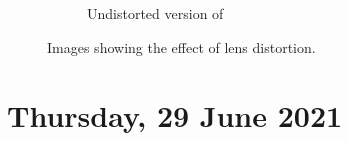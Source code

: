 \begin{figure}[H]
\begin{subfigure}[b]{0.45\textwidth}
        \caption{Undistorted version of }
        \label{fig:undistorted-checkerboard}
    \end{subfigure}
    \captionsetup{singlelinecheck = false, justification=justified}
    \caption{Images showing the effect of lens distortion.}
    \label{fig:checkerboard-distortion}
\end{figure}


\pendsign

\section[2021/06/29]{Thursday, 29 June 2021}

\subsection{}

\pendsign